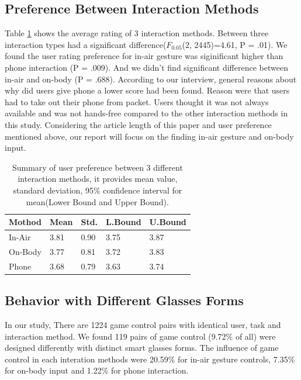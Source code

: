 \documentclass{sigchi}
\newcommand\tabhead[1]{\small\textbf{#1}}
\begin{document}
  \subsection{Preference Between Interaction Methods}
  Table \ref{tab:tablePreferenceInteractionMethod} shows the average rating of 3 interaction methods. Between three interaction types had a significant difference($F_{0.05}$(2, 2445)=4.61, P = .01). We found the user rating preference for in-air gesture was siginificant higher than phone interaction (P = .009). And we didn't find significant difference between in-air and on-body (P = .688).
  According to our interview, general reasons about why did users give phone a lower score had been found. Reason were that users had to take out their phone from packet. Users thought it was not always available and was not hands-free compared to the other interaction methods in this study. Considering the article length of this paper and user preference mentioned above, our report will focus on the finding in-air gesture and on-body input.

  \begin{table}
    \centering
    \begin{tabular}{|l|l|l|l|l|}
      \hline
      \tabhead{Mothod} &
      \multicolumn{1}{|p{0.13\columnwidth}|}{\centering\tabhead{Mean}} &
      \multicolumn{1}{|p{0.13\columnwidth}|}{\centering\tabhead{Std.}} &
      \multicolumn{1}{|p{0.13\columnwidth}|}{\centering\tabhead{L.Bound}} &
      \multicolumn{1}{|p{0.13\columnwidth}|}{\centering\tabhead{U.Bound}} \\
      \hline
      In-Air & 3.81 & 0.90 & 3.75 & 3.87\\
      \hline
      On-Body & 3.77 & 0.81 & 3.72 & 3.83\\
      \hline
      Phone & 3.68 & 0.79 & 3.63 & 3.74\\
      \hline

    \end{tabular}
    \caption{Summary of user preference between 3 different interaction methods, it provides mean value, standard deviation, 95\% confidence interval for mean(Lower Bound and Upper Bound).}
    \label{tab:tablePreferenceInteractionMethod}
  \end{table}

  \subsection{Behavior with Different Glasses Forms}
  In our study, There are 1224 game control pairs with identical user, task and interaction method. We found 119 pairs of game control (9.72\% of all) were designed differently with distinct smart glasses forms. The influence of game control in each interation methods were 20.59\% for in-air gesture controls, 7.35\% for on-body input and 1.22\% for phone interaction. 
\end{document}
